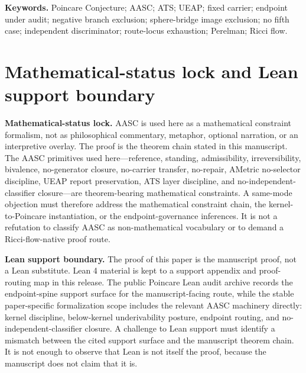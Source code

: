 \documentclass[11pt]{article}
\begin{document}
\noindent\textbf{Keywords.} Poincare Conjecture; AASC; ATS; UEAP; fixed carrier; endpoint under audit; negative branch exclusion; sphere-bridge image exclusion; no fifth case; independent discriminator; route-locus exhaustion; Perelman; Ricci flow.

\section*{Mathematical-status lock and Lean support boundary}

\begin{mdframed}[backgroundcolor=gray!8,linewidth=0.6pt]
\textbf{Mathematical-status lock.} AASC is used here as a mathematical constraint formalism, not as philosophical commentary, metaphor, optional narration, or an interpretive overlay.  The proof is the theorem chain stated in this manuscript.  The AASC primitives used here---reference, standing, admissibility, irreversibility, bivalence, no-generator closure, no-carrier transfer, no-repair, AMetric no-selector discipline, UEAP report preservation, ATS layer discipline, and no-independent-classifier closure---are theorem-bearing mathematical constraints.  A same-mode objection must therefore address the mathematical constraint chain, the kernel-to-Poincare instantiation, or the endpoint-governance inferences.  It is not a refutation to classify AASC as non-mathematical vocabulary or to demand a Ricci-flow-native proof route.
\end{mdframed}

\begin{mdframed}[backgroundcolor=gray!8,linewidth=0.6pt]
\textbf{Lean support boundary.} The proof of this paper is the manuscript proof, not a Lean substitute.  Lean 4 material is kept to a support appendix and proof-routing map in this release.  The public Poincare Lean audit archive records the endpoint-spine support surface for the manuscript-facing route, while the stable paper-specific formalization scope includes the relevant AASC machinery directly: kernel discipline, below-kernel underivability posture, endpoint routing, and no-independent-classifier closure.  A challenge to Lean support must identify a mismatch between the cited support surface and the manuscript theorem chain.  It is not enough to observe that Lean is not itself the proof, because the manuscript does not claim that it is.
\end{mdframed}
\end{document}
